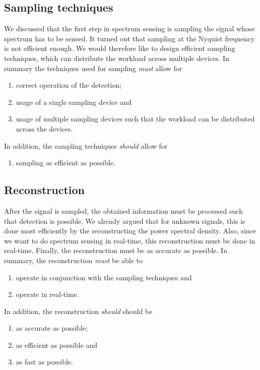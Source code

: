 \documentclass[a4paper, openany, oneside]{memoir}
\begin{document}
\subsection{Sampling techniques}
We discussed that the first step in spectrum sensing is sampling the signal whose spectrum has to be sensed. It turned out that sampling at the Nyquist frequency is not efficient enough. We would therefore like to design efficient sampling techniques, which can distribute the workload across multiple devices. In summary the techniques used for sampling \emph{must} allow for
\begin{enumerate}
    \item correct operation of the detection;
    \item usage of a single sampling device and
    \item usage of multiple sampling devices such that the workload can be distributed across the devices.
\end{enumerate}
In addition, the sampling techniques \emph{should} allow for
\begin{enumerate}
    \item sampling as efficient as possible.
\end{enumerate}

\subsection{Reconstruction}
After the signal is sampled, the obtained information must be processed such that detection is possible. We already argued that for unknown signals, this is done most efficiently by the reconstructing the power spectral density. Also, since we want to do spectrum sensing in real-time, this reconstruction must be done in real-time. Finally, the reconstruction must be as accurate as possible. In summary, the reconstruction \textit{must} be able to
\begin{enumerate}
    \item operate in conjunction with the sampling techniques and
    \item operate in real-time.
\end{enumerate}
In addition, the reconstruction \textit{should} should be
\begin{enumerate}
    \item as accurate as possible;
    \item as efficient as possible and
    \item as fast as possible.
\end{enumerate}
\end{document}
